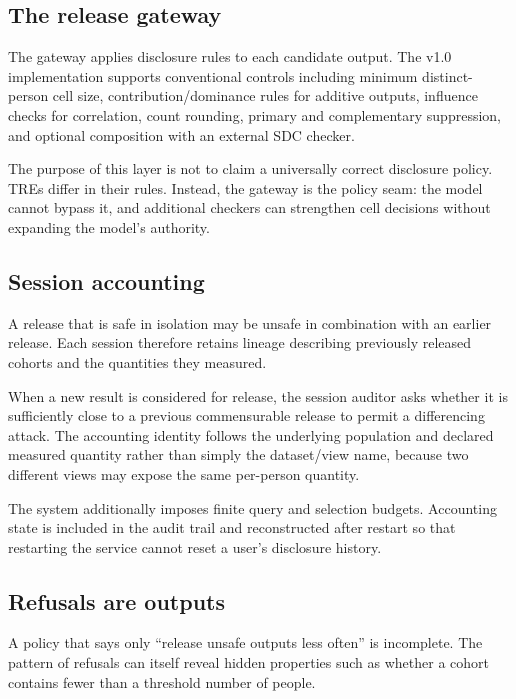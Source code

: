 \documentclass[11pt,a4paper]{article}
\begin{document}
\subsection{The release gateway}
\label{sec:gateway}

The gateway applies disclosure rules to each candidate output. The v1.0
implementation supports conventional controls including minimum distinct-person
cell size, contribution/dominance rules for additive outputs, influence checks
for correlation, count rounding, primary and complementary suppression, and
optional composition with an external SDC checker.

The purpose of this layer is not to claim a universally correct disclosure
policy. TREs differ in their rules. Instead, the gateway is the policy seam:
the model cannot bypass it, and additional checkers can strengthen cell
decisions without expanding the model's authority.

\subsection{Session accounting}
\label{sec:session}

A release that is safe in isolation may be unsafe in combination with an
earlier release. Each session therefore retains lineage describing previously
released cohorts and the quantities they measured.

When a new result is considered for release, the session auditor asks whether
it is sufficiently close to a previous commensurable release to permit a
differencing attack. The accounting identity follows the underlying population
and declared measured quantity rather than simply the dataset/view name,
because two different views may expose the same per-person quantity.

The system additionally imposes finite query and selection budgets. Accounting
state is included in the audit trail and reconstructed after restart so that
restarting the service cannot reset a user's disclosure history.

\subsection{Refusals are outputs}
\label{sec:refusals}

A policy that says only ``release unsafe outputs less often'' is incomplete.
The pattern of refusals can itself reveal hidden properties such as whether a
cohort contains fewer than a threshold number of people.
\end{document}
